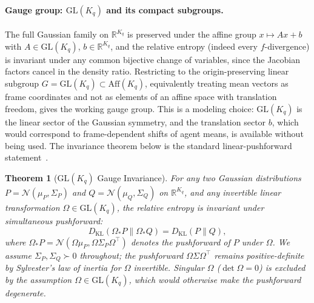 \documentclass[11pt]{article}
\newtheorem{theorem}{Theorem}
\begin{document}
\paragraph{Gauge group: $\mathrm{GL}(K_q)$ and its compact subgroups.}
\label{sec:gauge_group_choice}
The full Gaussian family on $\mathbb{R}^{K_q}$ is preserved under the affine group $x \mapsto Ax + b$ with $A \in \mathrm{GL}(K_q)$, $b \in \mathbb{R}^{K_q}$, and the relative entropy (indeed every $f$-divergence) is invariant under any common bijective change of variables, since the Jacobian factors cancel in the density ratio. Restricting to the origin-preserving linear subgroup $G = \mathrm{GL}(K_q) \subset \mathrm{Aff}(K_q)$, equivalently treating mean vectors as frame coordinates and not as elements of an affine space with translation freedom, gives the working gauge group. This is a modeling choice: $\mathrm{GL}(K_q)$ is the linear sector of the Gaussian symmetry, and the translation sector $b$, which would correspond to frame-dependent shifts of agent means, is available without being used. The invariance theorem below is the standard linear-pushforward statement~\cite{Amari2016}.

\begin{theorem}[$\mathrm{GL}(K_q)$ Gauge Invariance]
\label{thm:glk_invariance}
For any two Gaussian distributions $P = \mathcal{N}(\mu_P, \Sigma_P)$ and $Q = \mathcal{N}(\mu_Q, \Sigma_Q)$ on $\mathbb{R}^{K_q}$, and any invertible linear transformation $\Omega \in \mathrm{GL}(K_q)$, the relative entropy is invariant under simultaneous pushforward:
\begin{equation}
D_{\mathrm{KL}}(\Omega_* P \| \Omega_* Q) = D_{\mathrm{KL}}(P \| Q),
\label{eq:glk_invariance}
\end{equation}
where $\Omega_* P = \mathcal{N}(\Omega\mu_P, \Omega\Sigma_P\Omega^\top)$ denotes the pushforward of $P$ under $\Omega$. We assume $\Sigma_P, \Sigma_Q \succ 0$ throughout; the pushforward $\Omega\Sigma\Omega^\top$ remains positive-definite by Sylvester's law of inertia for $\Omega$ invertible. Singular $\Omega$ ($\det\Omega = 0$) is excluded by the assumption $\Omega \in \mathrm{GL}(K_q)$, which would otherwise make the pushforward degenerate.
\end{theorem}
\end{document}
